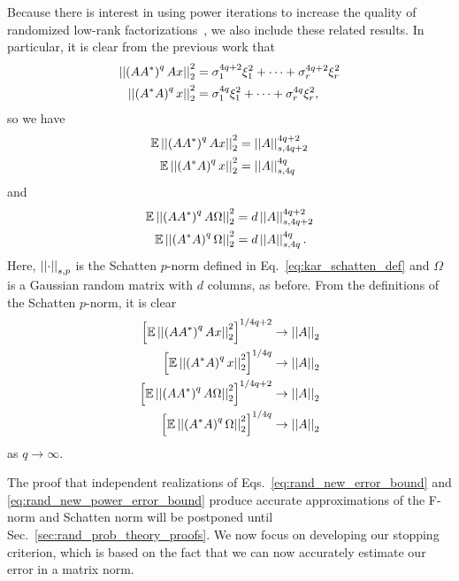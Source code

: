 Because there is interest in using power iterations to increase
the quality of randomized low-rank factorizations~\cite{RandomReview2011},
we also include these related results.
In particular, it is clear from the previous work that
%
\begin{align}
    \left| \left| \left( AA^{*} \right)^{q}Ax \right| \right|_{2}^{2}
        &= \sigma_{1}^{4q+2}\xi_{1}^{2} + \cdots + \sigma_{r}^{4q+2}\xi_{r}^{2}
        \nonumber\\
    \left| \left| \left( A^{*}A \right)^{q}x \right| \right|_{2}^{2}
        &= \sigma_{1}^{4q}\xi_{1}^{2} + \cdots + \sigma_{r}^{4q}\xi_{r}^{2},
\end{align}
%
so we have
%
\begin{align}
    \mathbb{E}\left| \left| \left( AA^{*} \right)^{q}Ax \right| \right|_{2}^{2}
        &= \left| \left| A \right| \right|_{s,4q+2}^{4q+2}
        \nonumber\\
    \mathbb{E}\left| \left| \left( A^{*}A \right)^{q}x \right| \right|_{2}^{2}
        &= \left| \left| A \right| \right|_{s,4q}^{4q}
\end{align}
%
and
%
\begin{align}
    \mathbb{E}\left| \left| \left( AA^{*} \right)^{q}A\Omega \right| \right|_{2}^{2}
        &= d\left| \left| A \right| \right|_{s,4q+2}^{4q+2}
        \nonumber\\
    \mathbb{E}\left| \left| \left( A^{*}A \right)^{q}\Omega \right| \right|_{2}^{2}
        &= d\left| \left| A \right| \right|_{s,4q}^{4q}.
    \label{eq:rand_new_power_error_bound}
\end{align}
%
Here, $\left| \left| \cdot \right| \right|_{s,p}$ is the Schatten $p$-norm defined
in Eq.~\eqref{eq:kar_schatten_def} and $\Omega$ is a Gaussian random
matrix with $d$ columns, as before.
From the definitions of the Schatten $p$-norm, it is clear
%
\begin{align}
    \left[ \mathbb{E}\left| \left| \left( AA^{*} \right)^{q}Ax \right| \right|_{2}^{2} \right]^{1/4q+2}
        &\to \left| \left| A \right| \right|_{2}
        \nonumber\\
    \left[ \mathbb{E}\left| \left| \left( A^{*}A \right)^{q}x \right| \right|_{2}^{2} \right]^{1/4q}
        &\to \left| \left| A \right| \right|_{2}
        \nonumber\\
    \left[ \mathbb{E}\left| \left| \left( AA^{*} \right)^{q}A\Omega \right| \right|_{2}^{2} \right]^{1/4q+2}
        &\to \left| \left| A \right| \right|_{2}
        \nonumber\\
    \left[ \mathbb{E}\left| \left| \left( A^{*}A \right)^{q}\Omega \right| \right|_{2}^{2} \right]^{1/4q}
        &\to \left| \left| A \right| \right|_{2}
\end{align}
%
as $q\to\infty$.

The proof that independent realizations of Eqs.~\eqref{eq:rand_new_error_bound}
and \eqref{eq:rand_new_power_error_bound}
produce accurate approximations of the F-norm and Schatten norm
will be postponed until Sec.~\ref{sec:rand_prob_theory_proofs}.
We now focus on developing our stopping criterion, which is based on
the fact that we can now accurately estimate our error in a matrix norm.





